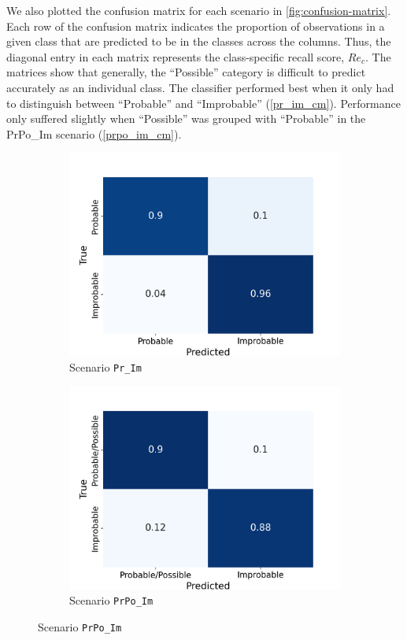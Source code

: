 \documentclass[Journal,letterpaper, SingleSpace, InsideFigs]{ascelike-new}
\begin{document}
We also plotted the confusion matrix for each scenario in \autoref{fig:confusion-matrix}.
Each row of the confusion matrix indicates the proportion of observations in a given class that are predicted to be in the classes across the columns.
Thus, the diagonal entry in each matrix represents the class-specific recall score, $Re_{c}$.
The matrices show that generally, the ``Possible'' category is difficult to predict accurately as an individual class.
The classifier performed best when it only had to distinguish between ``Probable'' and ``Improbable'' (\autoref{pr_im_cm}). Performance only suffered slightly when ``Possible'' was grouped with ``Probable'' in the PrPo\_Im scenario (\autoref{prpo_im_cm}).

\begin{figure}[ht]
  \centering
  \begin{subfigure}[t]{.45\linewidth}
    \centering
    \includegraphics[width=\linewidth, trim={0 0 1cm 1cm}, clip]{opt-confusion-matrix-Pr_Im-128-px.png}
    \caption{Scenario \texttt{Pr\_Im}}
    \label{pr_im_cm}
  \end{subfigure}%
   \begin{subfigure}[t]{.45\linewidth}
    \centering
    \includegraphics[width=\linewidth, trim={0 0 1cm 1cm}, clip]{opt-confusion-matrix-PrPo_Im-128-px.png}
    \caption{Scenario \texttt{PrPo\_Im}}
    \label{prpo_im_cm}
  \end{subfigure}%
  

\end{figure}
\end{document}
